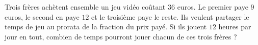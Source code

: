 
\begin{exercice}\label{exosmath-0869}

    Trois frères achètent ensemble un jeu vidéo coûtant \( 36\) euros. Le premier paye \( 9\) euros, le second en paye \( 12\) et le troisième paye le reste. Ils veulent partager le temps de jeu au prorata de la fraction du prix payé. Si ils jouent \( 12\) heures par jour en tout, combien de temps pourront jouer chacun de ces trois frères ?

\end{exercice}
